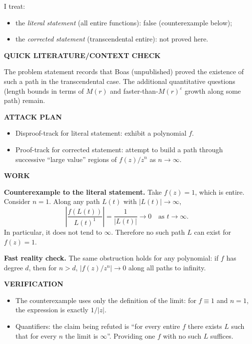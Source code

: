 I treat:
\begin{itemize}
\item the \emph{literal statement} (all entire functions): false (counterexample below);
\item the \emph{corrected statement} (transcendental entire): not proved here.
\end{itemize}

\medskip
\noindent\textbf{QUICK LITERATURE/CONTEXT CHECK}

The problem statement records that Boas (unpublished) proved the existence of such a path in the transcendental case. The additional quantitative questions (length bounds in terms of $M(r)$ and faster-than-$M(r)^\varepsilon$ growth along some path) remain.

\medskip
\noindent\textbf{ATTACK PLAN}

\begin{itemize}
\item Disproof-track for literal statement: exhibit a polynomial $f$.
\item Proof-track for corrected statement: attempt to build a path through successive ``large value'' regions of $f(z)/z^n$ as $n\to\infty$.
\end{itemize}

\medskip
\noindent\textbf{WORK}

\noindent\textbf{Counterexample to the literal statement.}
Take $f(z)=1$, which is entire. Consider $n=1$. Along any path $L(t)$ with $|L(t)|\to\infty$,
\[
\left|\frac{f(L(t))}{L(t)^1}\right| = \frac{1}{|L(t)|}\to 0
\quad\text{as }t\to\infty.
\]
In particular, it does not tend to $\infty$. Therefore no such path $L$ can exist for $f(z)=1$.

\medskip
\noindent\textbf{Fast reality check.}
The same obstruction holds for any polynomial: if $f$ has degree $d$, then for $n>d$, $|f(z)/z^n|\to 0$ along all paths to infinity.

\medskip
\noindent\textbf{VERIFICATION}

\begin{itemize}
\item The counterexample uses only the definition of the limit: for $f\equiv 1$ and $n=1$, the expression is exactly $1/|z|$.
\item Quantifiers: the claim being refuted is ``for every entire $f$ there exists $L$ such that for every $n$ the limit is $\infty$''. Providing one $f$ with no such $L$ suffices.
\end{itemize}

